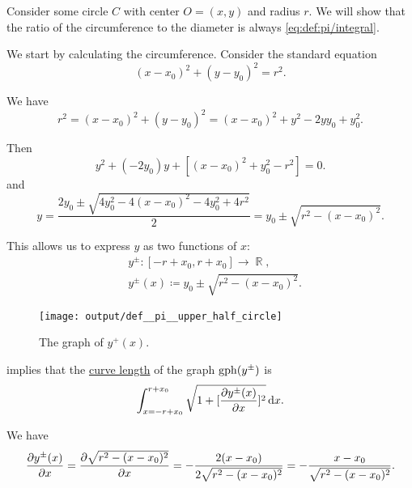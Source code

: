 \begin{defproof}
  Consider some circle \( C \) with center \( O = (x, y) \) and radius \( r \). We will show that the ratio of the circumference to the diameter is always \eqref{eq:def:pi/integral}.

  We start by calculating the circumference. Consider the standard equation
  \begin{equation*}
    (x - x_0)^2 + (y - y_0)^2 = r^2.
  \end{equation*}

  We have
  \begin{equation*}
    r^2
    =
    (x - x_0)^2 + (y - y_0)^2
    =
    (x - x_0)^2 + y^2 - 2 y y_0 + y_0^2.
  \end{equation*}

  Then
  \begin{equation*}
    y^2 + (-2y_0) y + [(x - x_0)^2 + y_0^2 - r^2] = 0.
  \end{equation*}
  and
  \begin{equation*}
    y = \frac {2y_0 \pm \sqrt{ 4y_0^2 - 4(x - x_0)^2 - 4y_0^2 + 4r^2 }} 2 = y_0 \pm \sqrt{ r^2 - (x - x_0)^2 }.
  \end{equation*}

  This allows us to express \( y \) as two functions of \( x \):
  \begin{equation*}
    \begin{aligned}
      &y^\pm: [-r + x_0, r + x_0] \to \BbbR, \\
      &y^\pm(x) \coloneqq y_0 \pm \sqrt{ r^2 - (x - x_0)^2 }.
    \end{aligned}
  \end{equation*}

  \begin{figure}[!ht]
    \centering
    \texttt{[image: output/def\_\_pi\_\_upper\_half\_circle]}
    \caption{The graph of \( y^+(x) \).}\label{fig:def:pi/upper_half_circle}
  \end{figure}

   implies that the \hyperref[def:arc_length]{curve length} of the graph \( \operatorname{gph}(y^\pm) \) is
  \begin{equation*}
    \int_{x=-r + x_0}^{r + x_0} \sqrt{ 1 + [\diffp {y^\pm(x)} x]^2 } \dl x.
  \end{equation*}

  We have
  \begin{equation*}
    \diffp {y^\pm(x)} x
    =
    \diffp {\sqrt{ r^2 - (x - x_0)^2 }} x
    =
    -\frac {2(x - x_0)} {2\sqrt{ r^2 - (x - x_0)^2 }}
    =
    -\frac {x - x_0} {\sqrt{ r^2 - (x - x_0)^2 }}.
  \end{equation*}


\end{defproof}
